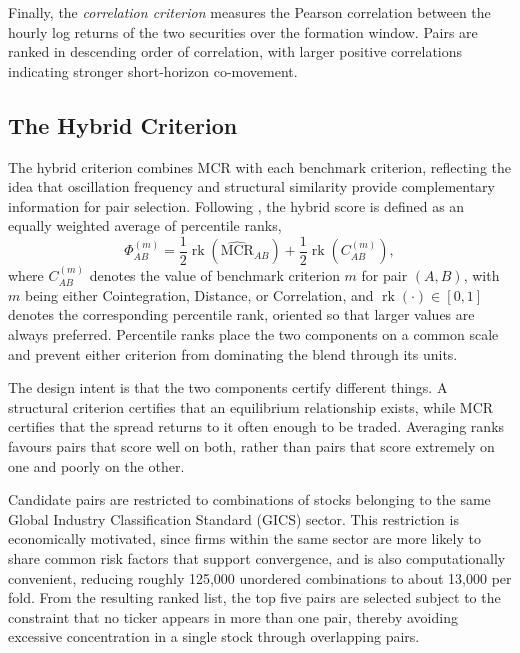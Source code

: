 \documentclass[11pt,a4paper]{article}
\theoremstyle{definition}
\newcommand{\MCR}{\ensuremath{\mathrm{MCR}}}
\begin{document}
Finally, the \emph{correlation criterion} measures the Pearson correlation between the hourly log returns of the two securities over the formation window. Pairs are ranked in descending order of correlation, with larger positive correlations indicating stronger short-horizon co-movement.

\subsection{The Hybrid Criterion}

The hybrid criterion combines MCR with each benchmark criterion, reflecting the
idea that oscillation frequency and structural similarity provide complementary
information for pair selection. Following \citet{reichmann2026}, the hybrid score
is defined as an equally weighted average of percentile ranks,
\begin{equation}
\Phi_{AB}^{(m)}
=
\frac{1}{2}\operatorname{rk}(\widehat{\mathrm{MCR}}_{AB})
+
\frac{1}{2}\operatorname{rk}(C_{AB}^{(m)}),
\label{eq:hybrid}
\end{equation}
where $C_{AB}^{(m)}$ denotes the value of benchmark criterion $m$ for pair
$(A,B)$, with $m$ being either Cointegration, Distance, or Correlation, and $\operatorname{rk}(\cdot)\in[0,1]$ denotes the corresponding percentile rank,
oriented so that larger values are always preferred. Percentile ranks place the two components on a common scale and
prevent either criterion from dominating the blend through its units.

The design intent is that the two components certify different things. A
structural criterion certifies that an equilibrium relationship exists, while \MCR{}
certifies that the spread returns to it often enough to be traded. Averaging
ranks favours pairs that score well on both, rather than pairs that score
extremely on one and poorly on the other.

Candidate pairs are restricted to combinations of stocks belonging to the same Global Industry Classification Standard (GICS) sector. This restriction
is economically motivated, since firms within the same sector are more likely to share
common risk factors that support convergence, and is also computationally convenient,
reducing roughly 125,000 unordered combinations to about 13,000 per fold. From the
resulting ranked list, the top five pairs are selected subject to the constraint that no
ticker appears in more than one pair, thereby avoiding excessive concentration in a
single stock through overlapping pairs.
\end{document}
